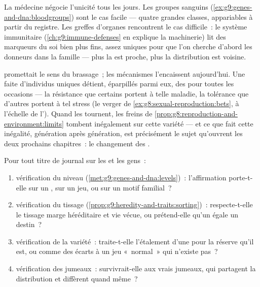 \begin{example}\label{ex:g9:unique-individuals:medicine}
La médecine négocie l'unicité tous les jours. Les groupes
sanguins (\cref{ex:g9:genes-and-dna:bloodgroups}) sont le
cas facile --- quatre grandes classes, appariables à partir
du registre. Les greffes d'organes rencontrent le cas
difficile~: le système immunitaire
(\cref{ch:g9:immune-defenses} en explique la machinerie) lit
des marqueurs du soi bien plus fins, assez uniques pour que
l'on cherche d'abord les donneurs dans la famille --- plus
la  est proche, plus la distribution est voisine.
\end{example}

\begin{proposition}\label{prop:g9:unique-individuals:reserve}
 promettait le sens
du brassage~; les mécanismes l'encaissent aujourd'hui. Une
 faite d'individus uniques détient, éparpillés parmi
eux, des  pour toutes les occasions --- la résistance
que certains portent à telle maladie, la tolérance que
d'autres portent à tel stress (le verger de
\cref{ex:g8:sexual-reproduction:bets}, à l'échelle de
l'). Quand les  tournent, les freins de
\cref{prop:g8:reproduction-and-environment:limits} tombent
inégalement sur cette variété --- et ce que fait cette
inégalité, génération après génération, est précisément le
sujet qu'ouvrent les deux prochains chapitres~: le
changement des .
\end{proposition}
\admitted

\begin{method}\label{met:g9:unique-individuals:claims}
Pour tout titre de journal sur les  et les gens~:
\begin{enumerate}
  \item vérification du niveau
        (\cref{met:g9:genes-and-dna:levels})~: l'affirmation
        porte-t-elle sur un , sur un jeu, ou sur un
        motif familial~?
  \item vérification du tissage
        (\cref{prop:g9:heredity-and-traits:sorting})~:
        respecte-t-elle le tissage marge héréditaire et vie
        vécue, ou prétend-elle qu'un  égale un destin~?
  \item vérification de la variété~: traite-t-elle
        l'étalement d'une  pour la réserve qu'il
        est, ou comme des écarts à un jeu «~normal~» qui
        n'existe pas~?
  \item vérification des jumeaux~: survivrait-elle aux vrais
        jumeaux, qui partagent la distribution et diffèrent
        quand même~?
\end{enumerate}
\end{method}

